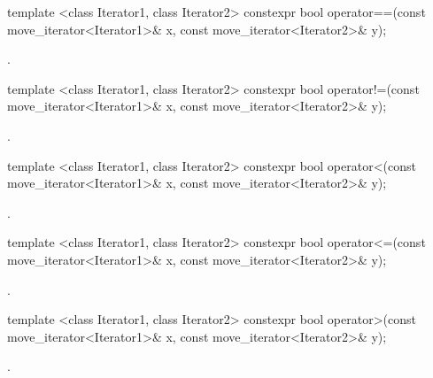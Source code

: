 %
\begin{itemdecl}
template <class Iterator1, class Iterator2>
constexpr bool operator==(const move_iterator<Iterator1>& x, const move_iterator<Iterator2>& y);
\end{itemdecl}

\begin{itemdescr}
\pnum
\returns {}.
\end{itemdescr}

%
\begin{itemdecl}
template <class Iterator1, class Iterator2>
constexpr bool operator!=(const move_iterator<Iterator1>& x, const move_iterator<Iterator2>& y);
\end{itemdecl}

\begin{itemdescr}
\pnum
\returns {}.
\end{itemdescr}

%
\begin{itemdecl}
template <class Iterator1, class Iterator2>
constexpr bool operator<(const move_iterator<Iterator1>& x, const move_iterator<Iterator2>& y);
\end{itemdecl}

\begin{itemdescr}
\pnum
\returns {}.
\end{itemdescr}

%
\begin{itemdecl}
template <class Iterator1, class Iterator2>
constexpr bool operator<=(const move_iterator<Iterator1>& x, const move_iterator<Iterator2>& y);
\end{itemdecl}

\begin{itemdescr}
\pnum
\returns {}.
\end{itemdescr}

%
\begin{itemdecl}
template <class Iterator1, class Iterator2>
constexpr bool operator>(const move_iterator<Iterator1>& x, const move_iterator<Iterator2>& y);
\end{itemdecl}

\begin{itemdescr}
\pnum
\returns {}.
\end{itemdescr}

